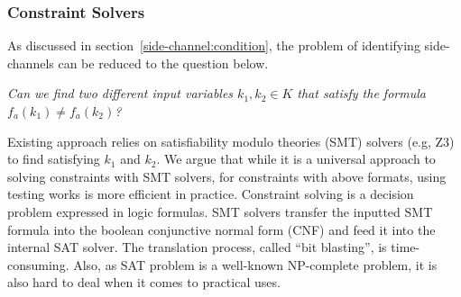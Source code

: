 \begin{table}[ht]
      \centering
      \caption{The number of X86 instructions and the number
      of REIL and VEX IR instructions on each trace of crypto programs.}
      \label{scala:ir}
      \end{table}

\subsubsection{Constraint Solvers}
As discussed in section~\ref{side-channel:condition}, the problem
of identifying side-channels can be reduced to the  
question below.


\textit{Can we find two different input variables $k_1, k_2 \in K$ that satisfy the
        formula $f_a(k_1) \neq f_a(k_2)$?}

Existing approach relies on satisfiability modulo theories (SMT) solvers (e.g, Z3) to 
find satisfying $k_1$ and $k_2$.
We argue that while it is a universal approach to solving constraints with SMT 
solvers, for constraints with above formats, using testing works is more
efficient in practice. Constraint solving is a decision problem expressed in 
logic formulas. SMT solvers transfer the inputted SMT formula into 
the boolean conjunctive normal form (CNF) and feed it into the internal 
SAT solver. The translation process, called ``bit blasting'', is time-consuming.
Also, as SAT problem is a well-known NP-complete problem, it is also hard to 
deal when it comes to practical uses.

